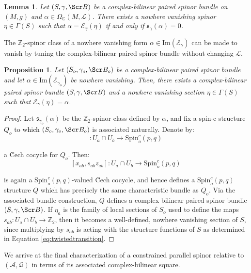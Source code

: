 \documentclass[10pt,a4paper,twoside,reqno]{amsart}
\theoremstyle{plain}
\newtheorem{prop}[thm]{Proposition}
\newtheorem{lemma}[thm]{Lemma}
\theoremstyle{definition}
\theoremstyle{remark}
\def\C{\mathbb{C}}
\def\cQ{\mathcal{Q}}
\def\scB{\Scr B}
\def\Spin{\mathrm{Spin}}
\def\Spin{\mathrm{Spin}}
\def\cA{\mathcal{A}}
\def\cE{\mathcal{E}}
\def\Im{\mathrm{Im}}
\def\cL{\mathcal{L}}
\begin{document}
\begin{lemma}
\label{lemma:Z2spinorclass}
Let $(S,\gamma,\scB)$ be a complex-bilinear paired spinor bundle on $(M,g)$ and $\alpha \in \Omega_{\C}(M,\cL)$. There exists a nowhere vanishing spinor $\eta\in\Gamma(S)$ such that $\alpha = \cE_{\gamma}(\eta)$ if and only if $\mathfrak{s}_{\gamma}(\alpha) = 0$.
\end{lemma}

The $\mathbb{Z}_2$-spinor class of a nowhere vanishing form $\alpha \in \Im(\cE_{\gamma})$ can be made to vanish by tuning the complex-bilinear paired spinor bundle without changing $\cL$.

\begin{prop}
Let $(S_o,\gamma_o,\scB_o)$ be a complex-bilinear paired spinor bundle and let $\alpha \in \Im(\cE_{\gamma_o})$ be nowhere vanishing. Then, there exists a complex-bilinear paired spinor bundle $(S,\gamma,\scB)$ and a nowhere vanishing section $\eta \in \Gamma(S)$ such that $\cE_{\gamma}(\eta) = \alpha$.
\end{prop}

\begin{proof}
Let $\mathfrak{s}_{\gamma_o}(\alpha)$  be the $\mathbb{Z}_2$-spinor class defined by $\alpha$, and fix a spin-c structure $Q_o$ to which $(S_o,\gamma_o,\scB_o)$ is associated naturally. Denote by:
\begin{equation*}
[x_{ab} , z_{ab}]\colon U_a \cap U_b \to \Spin^c_o(p,q)
\end{equation*}

\noindent
a \u{C}ech cocycle for $Q_o$. Then:
\begin{equation}
\label{eq:twistedtransition}
[x_{ab} , s_{ab} z_{ab}]\colon U_a \cap U_b \to \Spin^c_o(p,q)
\end{equation}

\noindent
is again a $\Spin^c_o(p,q)$-valued \u{C}ech cocycle, and hence defines a $\Spin^c_o(p,q)$ structure $Q$ which has precisely the same characteristic bundle as $Q_o$. Via the associated bundle construction, $Q$ defines a complex-bilinear paired spinor bundle $(S,\gamma,\scB)$. If $\eta_a$ is the family of local sections of $S_o$ used to define the maps $s_{ab}\colon U_a\cap U_b \to \mathbb{Z}_2$, then it becomes a well-defined, nowhere vanishing section of $S$, since multiplying by $s_{ab}$ is acting with the structure functions of $S$ as determined in Equation \eqref{eq:twistedtransition}.
\end{proof}

We arrive at the final characterization of a constrained parallel spinor relative to $(\cA,\cQ)$ in terms of its associated complex-bilinear square.
\end{document}
